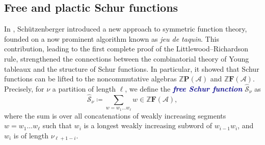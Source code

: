 \documentclass[12 pt]{amsart}
\newcommand{\newword}[1]{\textcolor{darkblue}{\textbf{\emph{#1}}}}
\newcommand{\Z}{\mathbb{Z}}
\newcommand{\Plactic}{{\mathbf{P}}}
\newcommand{\Free}{\mathbf{F}}
\newcommand{\FreeSchur}{\widehat{\mathcal{S}}}
\newcommand{\cA}{\mathcal{A}}
\theoremstyle{remark}
\numberwithin{equation}{section}
\begin{document}

\subsection{Free and plactic Schur functions}\label{sec:free!}
In \cite{Schutzenberger}, Sch\"utzenberger introduced a new approach to symmetric function theory, founded on a now prominent algorithm known as \emph{jeu de taquin}. This contribution, leading to the first complete proof of the Littlewood--Richardson rule, strengthened the connections between the combinatorial theory of Young tableaux and the structure of Schur functions. In particular, it showed that Schur functions can be lifted to the noncommutative algebras $\Z\Plactic(\cA)$ and $\Z \Free(\cA)$. Precisely, for $\nu$ a partition of length $\ell$, we define the \newword{free Schur function} $\FreeSchur_\nu$ as 
\begin{equation}\label{eq:FreeSchur}
    \FreeSchur_\nu \coloneqq \sum_{ w=w_1\ldots w_\ell } w \in \Z \Free(\cA),
\end{equation}
where the sum is over all concatenations of weakly increasing segments $w=w_1\ldots w_\ell$ such that $w_i$ is a longest weakly increasing subword of $w_{i-1}w_i$, and $w_i$ is of length $\nu_{\ell+1 - i}$.
\end{document}
